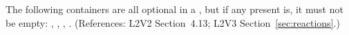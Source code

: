 The following containers are all optional in a \Reaction, but if any
present is, it must not be empty: ,
, , .
(References: L2V2 Section~4.13; L2V3 Section~\ref{sec:reactions}.)
